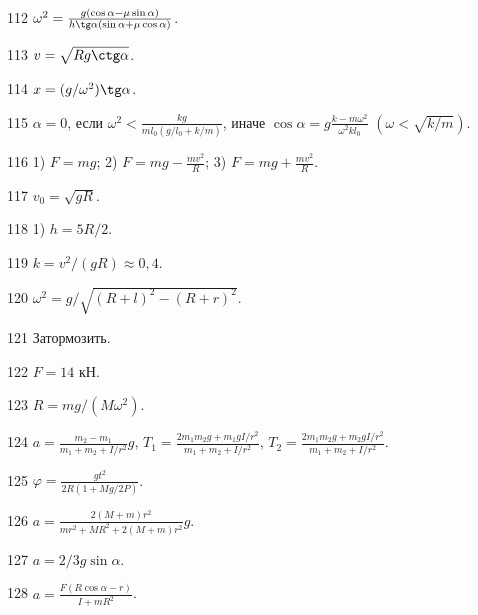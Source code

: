 \begin{Answer}{112}
$\omega^2 = \frac{g(\cos \alpha - \mu \sin \alpha)}{h \tg \alpha (\sin \alpha + \mu \cos \alpha)}$.
\end{Answer}
\begin{Answer}{113}
$v = \sqrt{Rg \ctg \alpha}$.
\end{Answer}
\begin{Answer}{114}
$x = (g/\omega^2) \tg \alpha$.
\end{Answer}
\begin{Answer}{115}
$\alpha = 0$, если $\omega^2 < \frac{kg}{ml_0(g/l_0 + k/m)}$, иначе $\cos \alpha = g\frac{k-m\omega^2}{\omega^2kl_0}$ $\left( \omega < \sqrt{k/m} \right)$.
\end{Answer}
\begin{Answer}{116}
1) $F=mg$; 2) $F=mg-\frac{mv^2}{R}$; 3) $F=mg+\frac{mv^2}{R}$.
\end{Answer}
\begin{Answer}{117}
$v_0 = \sqrt{gR}$.
\end{Answer}
\begin{Answer}{118}
1) $h=5R/2$.
\end{Answer}
\begin{Answer}{119}
$k=v^2/(gR) \approx 0,4$.
\end{Answer}
\begin{Answer}{120}
$\omega^2 = g/\sqrt{(R+l)^2-(R+r)^2}$.
\end{Answer}
\begin{Answer}{121}
Затормозить.
\end{Answer}
\begin{Answer}{122}
$F = 14$ кН.
\end{Answer}
\begin{Answer}{123}
$R = mg/(M\omega^2)$.
\end{Answer}
\begin{Answer}{124}
$a= \frac{m_2-m_1}{m_1+m_2+I/r^2}g$, $T_1 = \frac{2m_1m_2g + m_1gI/r^2}{m_1+m_2+I/r^2}$, $T_2 = \frac{2m_1m_2g + m_2gI/r^2}{m_1+m_2+I/r^2}$.
\end{Answer}
\begin{Answer}{125}
$\varphi = \frac{gt^2}{2R(1+Mg/2P)}$.
\end{Answer}
\begin{Answer}{126}
$a = \frac{2(M+m)r^2}{mr^2+MR^2+2(M+m)r^2}g$.
\end{Answer}
\begin{Answer}{127}
$a=2/3g\sin \alpha$.
\end{Answer}
\begin{Answer}{128}
$a = \frac{F(R\cos \alpha - r)}{I + mR^2}$.
\end{Answer}
